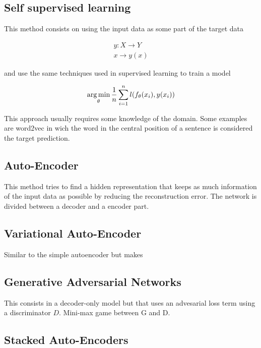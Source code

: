 \documentclass[b5paper]{report}
\begin{document}
\subsection{Self supervised learning}

This method consists on using the input data as some part of the target data

\begin{align}
  y: X \rightarrow Y \\
  x \rightarrow y(x)
\end{align}

and use the same techniques used in supervised learning to train a model


\begin{equation}
  \operatorname*{arg\,min}_\theta \frac{1}{n} \sum_{i=1}^n l(f_\theta(x_i), y(x_i))
\end{equation}

This approach usually requires some knowledge of the domain. Some examples are
word2vec in wich the word in the central position of a sentence is considered
the target prediction.

\subsection{Auto-Encoder}

This method tries to find a hidden representation that keeps as much
information of the input data as possible by reducing the reconstruction error.
The network is divided between a decoder and a encoder part.

\subsection{Variational Auto-Encoder}

Similar  to the simple autoencoder but makes


\subsection{Generative Adversarial Networks}

This consists in a decoder-only model but that uses an advesarial loss term
using a discriminator $D$. Mini-max game between G and D.

\subsection{Stacked Auto-Encoders}
\end{document}

